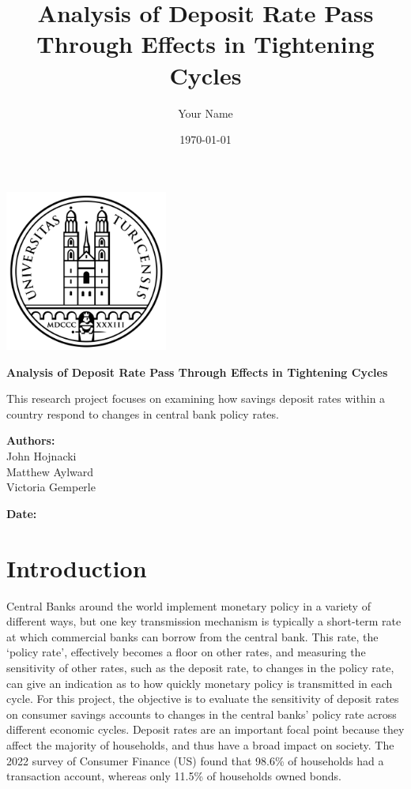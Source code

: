 \documentclass{article}
\title{\textbf{Analysis of Deposit Rate Pass Through Effects in Tightening Cycles}}
\author{Your Name}
\date{\today}
\begin{document}
\begin{titlepage}
    \centering
    \vspace*{-1.5cm} %
    \includegraphics[width=0.4\textwidth]{../../figures/University_of_Zurich_seal.png} %
    
    \vspace{2cm}
    \Huge
    \textbf{Analysis of Deposit Rate Pass Through Effects in Tightening Cycles}
    
    \vspace{1cm}
    \LARGE
    This research project focuses on examining how savings deposit rates within a country respond to changes in central bank policy rates. 
    
    \vspace{1cm}
    \textbf{Authors:}\\ John Hojnacki \\ Matthew Aylward \\ Victoria Gemperle
    \vspace{1cm}
    
    \textbf{Date:}\\
    \thedate
    \vfill
    
\end{titlepage}


\section{Introduction}

    \linespread{1}  %
    
Central Banks around the world implement monetary policy in a variety of different ways, but one key transmission mechanism is typically a short-term rate at which commercial banks can borrow from the central bank. This rate, the ‘policy rate’, effectively becomes a floor on other rates, and measuring the sensitivity of other rates, such as the deposit rate, to changes in the policy rate, can give an indication as to how quickly monetary policy is transmitted in each cycle. For this project, the objective is to evaluate the sensitivity of deposit rates on consumer savings accounts to changes in the central banks’ policy rate across different economic cycles. Deposit rates are an important focal point because they affect the majority of households, and thus have a broad impact on society. The 2022 survey of Consumer Finance (US) found that 98.6\% of households had a transaction account, whereas only 11.5\% of households owned bonds\cite{scf2022}.\\
\end{document}
